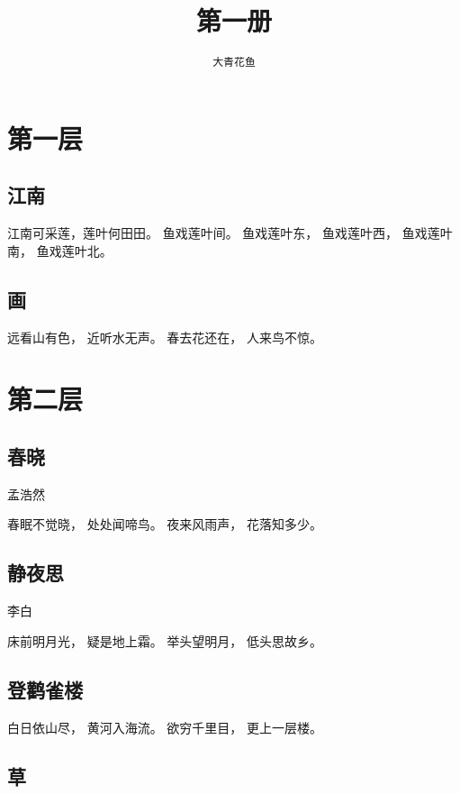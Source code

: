 \documentclass[12pt,UTF8]{ctexbook}
\title{\zihao{0} \bfseries 第一册}
\author{\zihao{2} \texttt{大青花鱼}}
\date{}
\begin{document}
\maketitle
\tableofcontents
\newpage

\chapter{第一层}

\section{江南}

江南可采莲，莲叶何田田。
鱼戏莲叶间。
鱼戏莲叶东，
鱼戏莲叶西，
鱼戏莲叶南，
鱼戏莲叶北。

\section{画}

远看山有色，
近听水无声。
春去花还在，
人来鸟不惊。

\chapter{第二层}

\section{春晓}

孟浩然

春眠不觉晓，
处处闻啼鸟。
夜来风雨声，
花落知多少。

\section{静夜思}

李白

床前明月光，
疑是地上霜。
举头望明月，
低头思故乡。

\section{}

\section{登鹳雀楼}

白日依山尽，
黄河入海流。
欲穷千里目，
更上一层楼。

\section{草}
\end{document}
